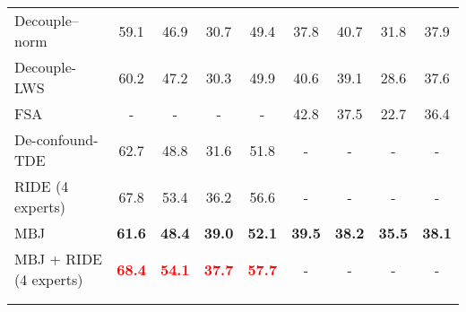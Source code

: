 \documentclass[final]{cvpr}
\begin{document}
\begin{table*}[ht]
\begin{tabular}{lcccccccc}
		\multicolumn{1}{l|}{Decouple--norm ~\cite{decoupling}}    & 59.1                 & 46.9                 & 30.7                 & \multicolumn{1}{c|}{49.4}          & 37.8                 & 40.7        & 31.8                 & 37.9                 \\
		\multicolumn{1}{l|}{Decouple-LWS ~\cite{decoupling}}             & 60.2                 & 47.2                 & 30.3                 & \multicolumn{1}{c|}{49.9}          & 40.6                 & 39.1                 & 28.6                 & 37.6                 \\
		\multicolumn{1}{l|}{FSA ~\cite{chu2020feature}}                      & -                 & -                 & -                 & \multicolumn{1}{c|}{-}          & 42.8                 & 37.5                 & 22.7                 & 36.4                 \\
		\multicolumn{1}{l|}{De-confound-TDE  ~\cite{tang2020long}   }          & 62.7                 & 48.8        & 31.6                 & \multicolumn{1}{c|}{51.8} & -                    & -                    & -                    & -                    \\ 
		\multicolumn{1}{l|}{RIDE (4 experts)  ~\cite{wang2020long}   }          & 67.8                 & 53.4        & 36.2                 & \multicolumn{1}{c|}{56.6} & -                    & -                    & -                    & -                    \\
		\hline
		\multicolumn{1}{l|}{MBJ}                      & \textbf{61.6}                 & \textbf{48.4}                 & \textbf{39.0}        & \multicolumn{1}{c|}{\textbf{52.1}}          & \textbf{39.5}                 & \textbf{38.2}                 & \textbf{35.5}        & \textbf{38.1}        \\ 
		\multicolumn{1}{l|}{MBJ + RIDE (4 experts)}                      & \textbf{\textcolor{red}{68.4}}                 & \textbf{\textcolor{red}{54.1}}                 & \textbf{\textcolor{red}{37.7}}        & \multicolumn{1}{c|}{\textbf{\textcolor{red}{57.7}}}          & -                 & -                 & -        & -        \\
		\hline
		& \multicolumn{1}{l}{} & \multicolumn{1}{l}{} & \multicolumn{1}{l}{} & \multicolumn{1}{l}{}               & \multicolumn{1}{l}{} & \multicolumn{1}{l}{} & \multicolumn{1}{l}{} & \multicolumn{1}{l}{} \\
		& \multicolumn{1}{l}{} & \multicolumn{1}{l}{} & \multicolumn{1}{l}{} & \multicolumn{1}{l}{}               & \multicolumn{1}{l}{} & \multicolumn{1}{l}{} & \multicolumn{1}{l}{} & \multicolumn{1}{l}{} \\

\end{tabular}
\end{table*}
\end{document}
